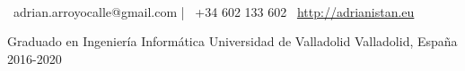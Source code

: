 \documentclass[]{awesome-cv}
\begin{document}
\begin{minipage}[b]{0.66666\textwidth}
\begin{center}
	  \\
	\vspace{2mm}
	{\faEnvelope\ adrian.arroyocalle@gmail.com} | {\faMobile\ +34 602 133 602}  {\faLink\ \url{http://adrianistan.eu}}
\end{center}
\end{minipage}

\begin{cventries}
	\cventry
	{Graduado en Ingeniería Informática}
	{Universidad de Valladolid}
	{Valladolid, España}
	{2016-2020}
	{}
\end{cventries}
\end{document}
